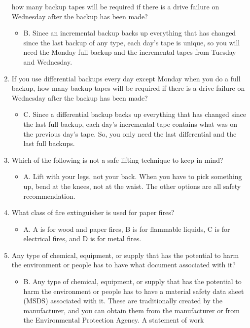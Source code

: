 \documentclass{article}
\begin{document}
\begin{enumerate}
how many backup tapes will be required if there is a drive failure on Wednesday after the
backup has been made?
    \begin{itemize}
        \item B. Since an incremental backup backs up everything that has changed since the last backup
of any type, each day’s tape is unique, so you will need the Monday full backup and the
incremental tapes from Tuesday and Wednesday.
    \end{itemize}
    \item If you use differential backups every day except Monday when you do a full backup, how
many backup tapes will be required if there is a drive failure on Wednesday after the
backup has been made?
    \begin{itemize}
        \item C. Since a differential backup backs up everything that has changed since the last full
backup, each day’s incremental tape contains what was on the previous day’s tape. So, you
only need the last differential and the last full backups.
    \end{itemize}
    \item Which of the following is not a safe lifting technique to keep in mind?
    \begin{itemize}
        \item A. Lift with your legs, not your back. When you have to pick something up, bend at the
knees, not at the waist. The other options are all safety recommendation.
    \end{itemize}
    \item What class of fire extinguisher is used for paper fires?
    \begin{itemize}
        \item A. A is for wood and paper fires, B is for flammable liquids, C is for electrical fires, and D
is for metal fires.
    \end{itemize}
    \item Any type of chemical, equipment, or supply that has the potential to harm the environment
or people has to have what document associated with it?
    \begin{itemize}
        \item B. Any type of chemical, equipment, or supply that has the potential to harm the
environment or people has to have a material safety data sheet (MSDS) associated with
it. These are traditionally created by the manufacturer, and you can obtain them from
the manufacturer or from the Environmental Protection Agency. A statement of work

\end{itemize}
\end{enumerate}
\end{document}
